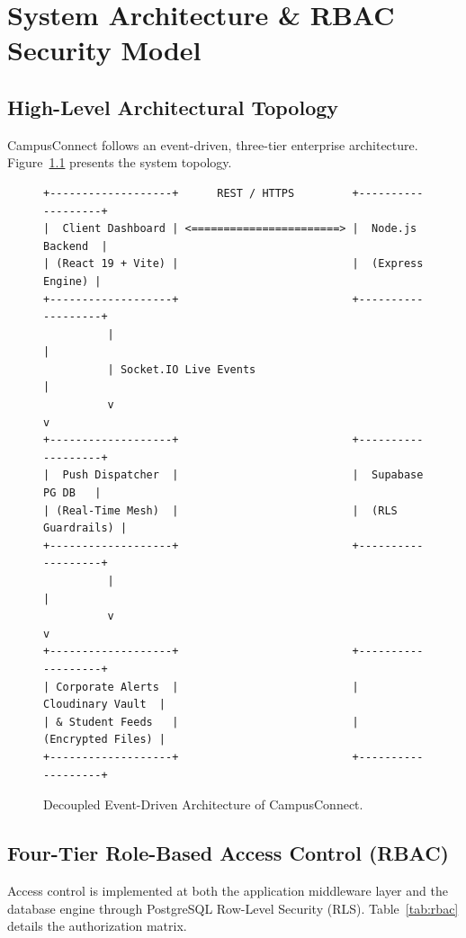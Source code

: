 \documentclass[12pt,a4paper]{report}
\begin{document}
\chapter{System Architecture \& RBAC Security Model}

\section{High-Level Architectural Topology}
CampusConnect follows an event-driven, three-tier enterprise architecture. Figure~\ref{fig:arch} presents the system topology.

\begin{figure}[htbp]
\centering
\begin{verbatim}
+-------------------+      REST / HTTPS         +-------------------+
|  Client Dashboard | <=======================> |  Node.js Backend  |
| (React 19 + Vite) |                           |  (Express Engine) |
+-------------------+                           +-------------------+
          |                                                |
          | Socket.IO Live Events                          |
          v                                                v
+-------------------+                           +-------------------+
|  Push Dispatcher  |                           |  Supabase PG DB   |
| (Real-Time Mesh)  |                           |  (RLS Guardrails) |
+-------------------+                           +-------------------+
          |                                                |
          v                                                v
+-------------------+                           +-------------------+
| Corporate Alerts  |                           | Cloudinary Vault  |
| & Student Feeds   |                           | (Encrypted Files) |
+-------------------+                           +-------------------+
\end{verbatim}
\caption{Decoupled Event-Driven Architecture of CampusConnect.}
\label{fig:arch}
\end{figure}

\section{Four-Tier Role-Based Access Control (RBAC)}
Access control is implemented at both the application middleware layer and the database engine through PostgreSQL Row-Level Security (RLS). Table~\ref{tab:rbac} details the authorization matrix.
\end{document}
